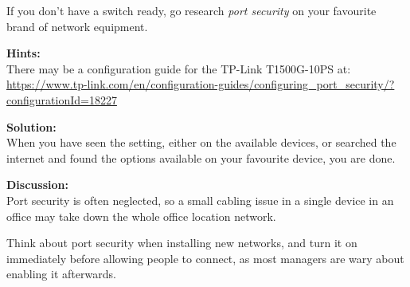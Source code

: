 \documentclass[a4paper,11pt,notitlepage]{report}
\begin{document}
If you don't have a switch ready, go research \emph{port security} on your favourite brand of network equipment.

{\bf Hints:}\\
There may be a configuration guide for the TP-Link T1500G-10PS at:\\
{\small\url{https://www.tp-link.com/en/configuration-guides/configuring_port_security/?configurationId=18227}}

{\bf Solution:}\\
When you have seen the setting, either on the available devices, or searched the internet and found the options available on your favourite device, you are done.

{\bf Discussion:}\\
Port security is often neglected, so a small cabling issue in a single device in an office may take down the whole office location network.

Think about port security when installing new networks, and turn it on immediately before allowing people to connect, as most managers are wary about enabling it afterwards.
\end{document}

